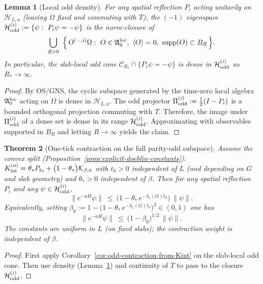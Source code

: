 \documentclass[11pt]{amsart}
\theoremstyle{plain}
\newtheorem{theorem}{Theorem}[section]
\newtheorem{lemma}[theorem]{Lemma}
\theoremstyle{definition}
\theoremstyle{remark}
\renewcommand{\tfrac}[2]{\textstyle\frac{#1}{#2}}
\begin{document}
\begin{lemma}[Local odd density]\label{lem:odd-density}
For any spatial reflection $P_i$ acting unitarily on $\mathcal H_{L,a}$ (leaving $\Omega$ fixed and commuting with $T$), the $(-1)$ eigenspace $\mathcal H_{\rm odd}^{(i)}:=\{\psi:\ P_i\psi=-\psi\}$ is the norm-closure of
\[
  \bigcup_{R>0}\ \Big\{\,O^{(-,i)}\Omega:\ O\in \mathfrak A_0^{\rm loc},\ \langle O\rangle=0,\ \mathrm{supp}(O)\subset B_R\,\Big\}.
\]
In particular, the slab-local odd cone $\mathcal C_{R_*}\cap\{P_i\psi=-\psi\}$ is dense in $\mathcal H_{\rm odd}^{(i)}$ as $R_*\to\infty$.
\end{lemma}
\begin{proof}
By OS/GNS, the cyclic subspace generated by the time-zero local algebra $\mathfrak A_0^{\rm loc}$ acting on $\Omega$ is dense in $\mathcal H_{L,a}$. The odd projector $\Pi_{\rm odd}^{(i)}:=\tfrac12(I-P_i)$ is a bounded orthogonal projection commuting with $T$. Therefore, the image under $\Pi_{\rm odd}^{(i)}$ of a dense set is dense in its range $\mathcal H_{\rm odd}^{(i)}$. Approximating with observables supported in $B_R$ and letting $R\to\infty$ yields the claim.
\end{proof}

\begin{theorem}[One-tick contraction on the full parity-odd subspace]\label{thm:uniform-odd-contraction}
Assume the convex split (Proposition~\ref{prop:explicit-doeblin-constants}): $K_{\rm int}^{(a)}=\theta_* P_{t_0}+\big(1-\theta_*\big)\mathcal K_{\beta,a}$ with $t_0>0$ independent of $L$ (and depending on $G$ and slab geometry) and $\theta_*>0$ independent of $\beta$. Then for any spatial reflection $P_i$ and any $\psi\in \mathcal H_{\rm odd}^{(i)}$,
\[
  \|e^{-aH}\psi\|\ \le\ \big(1-\theta_*\, e^{-\lambda_1(G) t_0}\big)\,\|\psi\|.
\]
Equivalently, setting $\beta_0:=1-\big(1-\theta_*\, e^{-\lambda_1(G) t_0}\big)^2\in(0,1)$ one has
\[
  \|e^{-aH}\psi\|\ \le\ \big(1-\beta_0\big)^{1/2}\,\|\psi\|.
\]
The constants are uniform in $L$ (on fixed slabs); the contraction weight is independent of $\beta$.
\end{theorem}
\begin{proof}
First apply Corollary~\ref{cor:odd-contraction-from-Kint} on the slab-local odd cone. Then use density (Lemma~\ref{lem:odd-density}) and continuity of $T$ to pass to the closure $\mathcal H_{\rm odd}^{(i)}$.
\end{proof}
\end{document}
